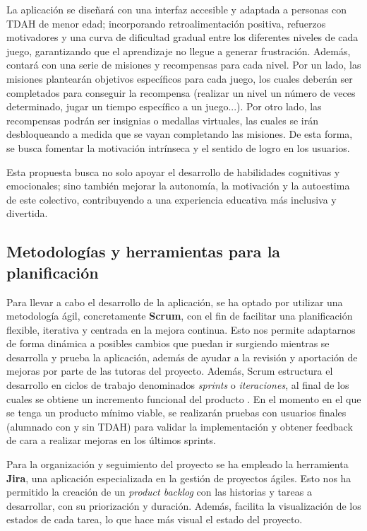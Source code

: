 La aplicación se diseñará con una interfaz accesible y adaptada a personas con TDAH de menor edad; incorporando retroalimentación positiva, refuerzos motivadores y una curva de dificultad gradual entre los diferentes niveles de cada juego, garantizando que el aprendizaje no llegue a generar frustración.
Además, contará con una serie de misiones y recompensas para cada nivel.
Por un lado, las misiones plantearán objetivos específicos para cada juego, los cuales deberán ser completados para conseguir la recompensa (realizar un nivel un número de veces determinado, jugar un tiempo específico a un juego...).
Por otro lado, las recompensas podrán ser insignias o medallas virtuales, las cuales se irán desbloqueando a medida que se vayan completando las misiones. 
De esta forma, se busca fomentar la motivación intrínseca y el sentido de logro en los usuarios.

Esta propuesta busca no solo apoyar el desarrollo de habilidades cognitivas y emocionales; sino también mejorar la autonomía, la motivación y la autoestima de este colectivo, contribuyendo a una experiencia educativa más inclusiva y divertida.

\subsection{Metodologías y herramientas para la planificación}
Para llevar a cabo el desarrollo de la aplicación, se ha optado por utilizar una metodología ágil, concretamente \textbf{Scrum}, con el fin de facilitar una planificación flexible, iterativa y centrada en la mejora continua. 
Esto nos permite adaptarnos de forma dinámica a posibles cambios que puedan ir surgiendo mientras se desarrolla y prueba la aplicación, además de ayudar a la revisión y aportación de mejoras por parte de las tutoras del proyecto.
Además, Scrum estructura el desarrollo en ciclos de trabajo denominados \textit{sprints} o \textit{iteraciones}, al final de los cuales se obtiene un incremento funcional del producto \parencite{proyectosagiles}.
En el momento en el que se tenga un producto mínimo viable, se realizarán pruebas con usuarios finales (alumnado con y sin TDAH) para validar la implementación y obtener feedback de cara a realizar mejoras en los últimos sprints.

Para la organización y seguimiento del proyecto se ha empleado la herramienta \textbf{Jira}, una aplicación especializada en la gestión de proyectos ágiles. 
Esto nos ha permitido la creación de un \textit{product backlog} con las historias y tareas a desarrollar, con su priorización y duración. 
Además, facilita la visualización de los estados de cada tarea, lo que hace más visual el estado del proyecto.

